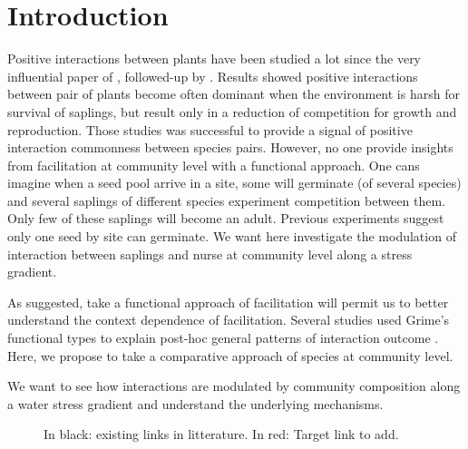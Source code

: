 \documentclass[12pt]{article} %
\begin{document}
\section{Introduction}

Positive interactions between plants have been studied a lot since the very influential paper of \citep{Bertness1994}, followed-up by \citep{Bruno2003}. Results showed positive interactions between pair of plants become often dominant when the environment is harsh for survival of saplings, but result only in a reduction of competition for growth and reproduction\citep{He2013}. Those studies was successful to provide a signal of positive interaction commonness between species pairs. However, no one provide insights from facilitation at community level with a functional approach. One cans imagine when a seed pool arrive in a site, some will germinate (of several species) and several saplings of different species experiment competition between them. Only few of these saplings will become an adult. Previous experiments suggest only one seed by site can germinate. We want here investigate the modulation of interaction between saplings and nurse at community level along a stress gradient.

As \citet{Butterfield2013} suggested, take a functional approach of facilitation will permit us to better understand the context dependence of facilitation. Several studies used Grime's functional types to explain post-hoc general patterns of interaction outcome \citep{Maestre2009,Butterfield2013}. Here, we propose to take a comparative approach of species at community level.

We want to see how interactions are modulated by community composition along a water stress gradient and understand the underlying mechanisms.

\begin{figure}
\begin{center}
\end{center}
\caption{In black: existing links in litterature. In red: Target link to add.}
\end{figure}
\end{document}
